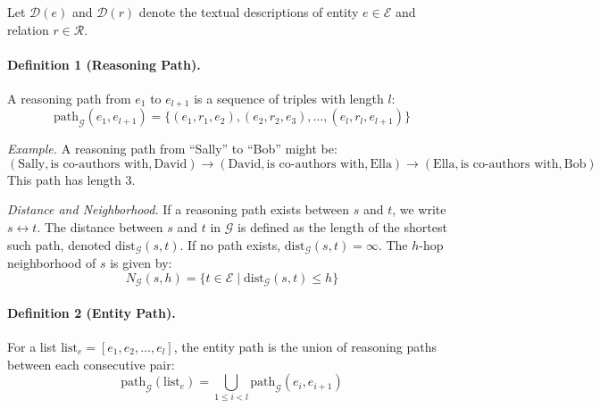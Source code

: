 \documentclass{article}
\begin{document}
Let $\mathcal{D}(e)$ and $\mathcal{D}(r)$ denote the textual descriptions of entity $e \in \mathcal{E}$ and relation $r \in \mathcal{R}$.

\paragraph{Definition 1 (Reasoning Path).} 
A reasoning path from $e_1$ to $e_{l+1}$ is a sequence of triples with length $l$:
\[
\text{path}_{\mathcal{G}}(e_1, e_{l+1}) = \{(e_1, r_1, e_2), (e_2, r_2, e_3), \dots, (e_l, r_l, e_{l+1})\}
\]

\medskip
\noindent\textit{Example.}
A reasoning path from “Sally” to “Bob” might be:
\[
(\text{Sally}, \text{is co-authors with}, \text{David}) \rightarrow (\text{David}, \text{is co-authors with}, \text{Ella}) \rightarrow (\text{Ella}, \text{is co-authors with}, \text{Bob})
\]
This path has length 3.

\medskip
\noindent\textit{Distance and Neighborhood.}
If a reasoning path exists between $s$ and $t$, we write $s \leftrightarrow t$. The distance between $s$ and $t$ in $\mathcal{G}$ is defined as the length of the shortest such path, denoted $\text{dist}_{\mathcal{G}}(s, t)$. If no path exists, $\text{dist}_{\mathcal{G}}(s, t) = \infty$. The $h$-hop neighborhood of $s$ is given by:
\[
N_{\mathcal{G}}(s, h) = \{t \in \mathcal{E} \mid \text{dist}_{\mathcal{G}}(s, t) \leq h\}
\]

\paragraph{Definition 2 (Entity Path).}
For a list $\text{list}_e = [e_1, e_2, \dots, e_l]$, the entity path is the union of reasoning paths between each consecutive pair:
\[
\text{path}_{\mathcal{G}}(\text{list}_e) = \bigcup_{1 \leq i < l} \text{path}_{\mathcal{G}}(e_i, e_{i+1})
\]
\end{document}
